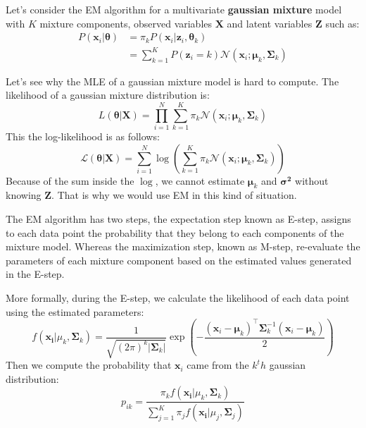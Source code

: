 \documentclass[12pt]{report}
\begin{document}
            Let's consider the EM algorithm for a multivariate \textbf{gaussian mixture} model with $K$ mixture components, observed variables $\boldsymbol{X}$ and latent variables $\boldsymbol{Z}$ such as:
            \begin{align}
                P(\boldsymbol{x}_i | \boldsymbol{\theta}) &= \pi_k P(\boldsymbol{x}_i | \boldsymbol{z}_i, \boldsymbol{\theta}_k)\\
                &= \sum_{k=1}^{K} P(\boldsymbol{z}_i = k) \mathcal{N}(\boldsymbol{x}_i; \boldsymbol{\mu}_k, \boldsymbol{\Sigma}_k)
            \end{align}
            
            Let's see why the MLE of a gaussian mixture model is hard to compute. The likelihood of a gaussian mixture distribution is:
            \begin{equation}
                L(\boldsymbol{\theta} | \boldsymbol{X}) = \prod_{i=1}^N\sum_{k=1}^{K} \pi_k \mathcal{N}(\boldsymbol{x}_i; \boldsymbol{\mu}_k, \boldsymbol{\Sigma}_k)
            \end{equation}
            This the log-likelihood is as follows:
            \begin{equation}
                \mathcal{L}(\boldsymbol{\theta} | \boldsymbol{X}) = \sum_{i=1}^N \log\left(\sum_{k=1}^{K} \pi_k \mathcal{N}(\boldsymbol{x}_i; \boldsymbol{\mu}_k, \boldsymbol{\Sigma}_k)\right)
            \end{equation}
            Because of the sum inside the $\log$, we cannot estimate $\boldsymbol{\mu}_k$ and $\boldsymbol{\sigma^2}$ without knowing $\boldsymbol{Z}$. That is why we would use EM in this kind of situation.
            
            The EM algorithm has two steps, the expectation step known as E-step, assigns to each data point the probability that they belong to each
            components of the mixture model. Whereas the maximization step, known as M-step, re-evaluate the parameters of each mixture component based on the estimated values generated in the E-step.
            
            More formally, during the E-step, we calculate the likelihood of each data point using the estimated parameters:
            \begin{equation}
                f(\boldsymbol{x_i}|\mu_k, \boldsymbol{\Sigma}_k) = \frac{1}{\sqrt{(2\pi)^k|\boldsymbol{\Sigma}_k|}} \exp\left(-\frac{(\boldsymbol{x}_i - \boldsymbol{\mu}_k)^\top \boldsymbol{\Sigma}_k^{-1}(\boldsymbol{x}_i - \boldsymbol{\mu}_k)}{2}\right)
            \end{equation}
            Then we compute the probability that $\boldsymbol{x}_i$ came from the $k^th$ gaussian distribution:
            \begin{equation}
                p_{ik} = \frac{\pi_k f(\boldsymbol{x_i}|\mu_k, \boldsymbol{\Sigma}_k)}{\sum_{j=1}^{K} \pi_j f(\boldsymbol{x_i}|\mu_j, \boldsymbol{\Sigma}_j)}
            \end{equation}
            
\end{document}
